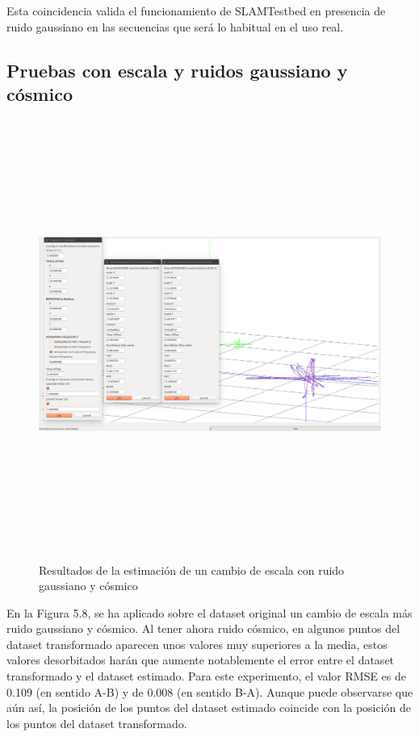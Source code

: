 Esta coincidencia valida el funcionamiento de SLAMTestbed en presencia de ruido gaussiano en las secuencias que será lo habitual en el uso real.

\subsection{Pruebas con escala y ruidos gaussiano y cósmico}
\begin{figure}[H]
\begin{center}
\label{fig:opciones de View}\includegraphics[height=14.0cm,width=18.0cm]{img/cap6/Escala_GaussCosmicNoise_abba.png}
\hspace{0.5cm}

\end{center}

\caption{Resultados de la estimación de un cambio de escala con ruido gaussiano y cósmico}
\end{figure}

En la Figura 5.8, se ha aplicado sobre el dataset original un cambio de escala más ruido gaussiano y cósmico. Al tener ahora ruido cósmico, en algunos puntos del dataset transformado aparecen unos valores muy superiores a la media, estos valores desorbitados harán que aumente notablemente el error entre el dataset transformado y el dataset estimado.
Para este experimento, el valor RMSE es de 0.109 (en sentido A-B) y de 0.008 (en sentido B-A). Aunque puede observarse que aún así, la posición de los puntos del dataset estimado coincide con la posición de los puntos del dataset transformado.


